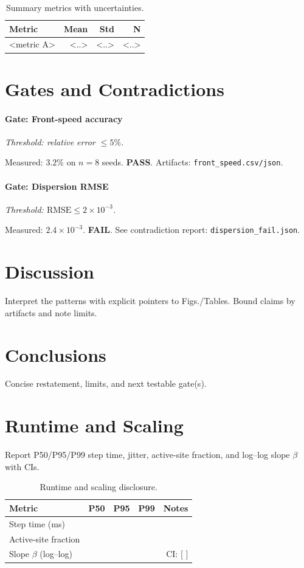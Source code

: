 \documentclass{article}
\newenvironment{vdmgate}[2]{%
  \paragraph{Gate: #1} \emph{Threshold: #2.}%
  \par\noindent}{\medskip}
\begin{document}
\begin{table}[t]
  \centering
  \caption{Summary metrics with uncertainties.}
  \label{tab:summary}
  \begin{tabular}{@{}lrrr@{}}
  \toprule
  Metric & Mean & Std & N \\
  \midrule
  <metric A> & <..> & <..> & <..> \\
  \bottomrule
  \end{tabular}
\end{table}

\section{Gates and Contradictions}
\begin{vdmgate}{Front-speed accuracy}{relative error $\le 5\%$}
Measured: $3.2\%$ on $n=8$ seeds. \textbf{PASS}. Artifacts: \texttt{front\_speed.csv/json}.
\end{vdmgate}

\begin{vdmgate}{Dispersion RMSE}{$\mathrm{RMSE}\le 2\times 10^{-3}$}
Measured: $2.4\times10^{-3}$. \textbf{FAIL}. See contradiction report:
\texttt{dispersion\_fail.json}.
\end{vdmgate}

\section{Discussion}
Interpret the patterns with explicit pointers to Figs./Tables. Bound claims by artifacts and note limits.

\section{Conclusions}
Concise restatement, limits, and next testable gate(s).

\section{Runtime and Scaling}
Report P50/P95/P99 step time, jitter, active-site fraction, and log–log slope $\beta$ with CIs.

\begin{table}[t]
  \centering
  \caption{Runtime and scaling disclosure.}
  \label{tab:runtime}
  \begin{tabular}{@{}lrrrr@{}}
  \toprule
  Metric & P50 & P95 & P99 & Notes \\
  \midrule
  Step time (ms) &  &  &  & \\
  Active-site fraction &  &  &  & \\
  Slope $\beta$ (log–log) &  &  &  & CI: [\,\,] \\
  \bottomrule
  \end{tabular}
\end{table}

\end{document}
